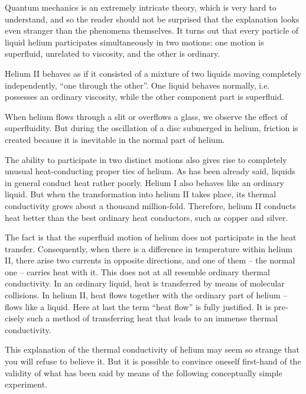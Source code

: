 Quantum mechanics is an extremely intricate theory, which is very hard to understand, and so the reader should not be surprised that the explanation looks even stranger than the phenomena themselves. It turns out that every particle of liquid helium participates simultaneously in two motions: one motion is superfluid, unrelated to vis­cosity, and the other is ordinary.

Helium II behaves as if it consisted of a mixture of two liquids moving completely independently, ``one through the other''. One liquid behaves normally, i.e. possesses an ordinary viscosity, while the other component part is superfluid.

When helium flows through a slit or overflows a glass, we observe the effect of superfluidity. But during the oscillation of a disc submerged in helium, friction is created because it is inevitable in the normal part of helium.

The ability to participate in two distinct motions also gives rise to completely unusual heat-conducting proper­ ties of helium. As has been already said, liquids in general conduct heat rather poorly. Helium I also behaves like an ordinary liquid. But when the transformation into he­lium II takes place, its thermal conductivity grows about a thousand million-fold. Therefore, helium II conducts heat better than the best ordinary heat conductors, such as copper and silver.

The fact is that the superfluid motion of helium does not participate in the heat transfer. Consequently, when there is a difference in temperature within helium II, there arise two currents in opposite directions, and one of them -- the normal one -- carries heat with it. This does not at all resemble ordinary thermal conductivity. In an ordinary liquid, heat is transferred by means of mo­lecular collisions. In helium II, heat flows together with the ordinary part of helium -- flows like a liquid. Here at last the term ``heat flow'' is fully justified. It is pre­cisely such a method of transferring heat that leads to an immense thermal conductivity.

This explanation of the thermal conductivity of helium may seem so strange that you will refuse to believe it. But it is possible to convince oneself first-hand of the validity of what has been said by means of the following conceptually simple experiment.

